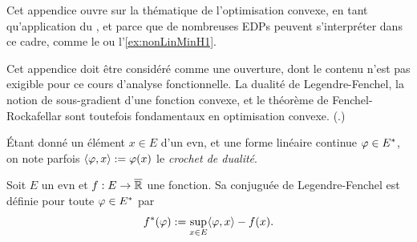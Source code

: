 Cet appendice ouvre sur la thématique de l'optimisation convexe, en tant qu'application du , et parce que de nombreuses EDPs peuvent s'interpréter dans ce cadre, comme le  ou l'\cref{ex:nonLinMinH1}.

\begin{retenir}
Cet appendice doit être considéré comme une ouverture, dont le contenu n'est pas exigible pour ce cours d'analyse fonctionnelle. La dualité de Legendre-Fenchel, la notion de sous-gradient d'une fonction convexe, et le théorème de Fenchel-Rockafellar sont toutefois fondamentaux en optimisation convexe. (.)
\end{retenir}


Étant donné un élément $x\in E$ d'un evn, et une forme linéaire continue $\varphi \in E^*$, on note parfois $\langle\varphi,x\rangle := \varphi(x)$ le \emph{crochet de dualité}. 

\begin{definition}
\label{def:legendre_fenchel}
%
Soit $E$ un evn et $f : E \to \overline {\mathbb{R}}$ une fonction. Sa conjuguée de Legendre-Fenchel est définie pour toute $\varphi \in E^*$ par 
	\begin{equation}
	\label{eqdef:lengedre_fenchel}
		f^*(\varphi) := \sup_{x \in E} \langle\varphi,x\rangle - f(x).
	\end{equation}
\end{definition}

